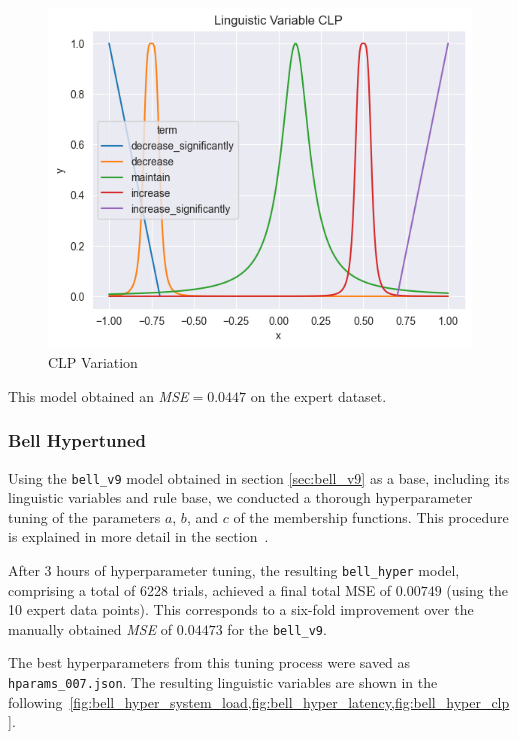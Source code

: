 \documentclass[titlepage]{article}
\begin{document}
\begin{figure}[H]
    \hfill
    \begin{minipage}{0.32\textwidth}
        \centering
        \includegraphics[width=\textwidth]{../images/bell_v9/CLP}
        \caption{CLP Variation}
        \label{fig:bellv9_clp}
    \end{minipage}
\end{figure}

This model obtained an \emph{MSE}$=0.0447$ on the expert dataset.

\subsubsection{Bell Hypertuned}
\label{sec:bell_hyper}
Using the \texttt{bell\_v9} model obtained in section \cref{sec:bell_v9} as a base, including its linguistic variables and rule base, we conducted a thorough hyperparameter tuning of the parameters $a$, $b$, and $c$ of the membership functions.
This procedure is explained in more detail in the section~.

After 3 hours of hyperparameter tuning, the resulting \texttt{bell\_hyper} model, comprising a total of 6228 trials, achieved a final total MSE of $0.00749$ (using the 10 expert data points).  
This corresponds to a six-fold improvement over the manually obtained \emph{MSE} of $0.04473$ for the \texttt{bell\_v9}.

The best hyperparameters from this tuning process were saved as \texttt{hparams\_007.json}.
The resulting linguistic variables are shown in the following~\cref{fig:bell_hyper_system_load,fig:bell_hyper_latency,fig:bell_hyper_clp}.
\end{document}
